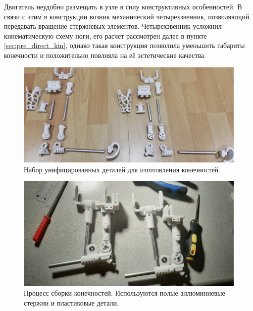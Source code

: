 Двигатель неудобно размещать в узле в силу конструктивных особенностей. В связи с этим в конструкции возник механический четырехзвенник, позволяющий передавать вращение стержневых элементов. Четырехзвенник усложнил кинематическую схему ноги, его расчет рассмотрен далее в пункте \ref{sec:pre_direct_kin}, однако такая конструкция позволила уменьшить габариты конечности и положительно повлияла на её эстетические качества. 

\begin{figure}[h]
    \centering
    \includegraphics[width=\textwidth]{chapter_mechanics_construction/figure14.jpg}
    \caption{Набор унифицированных деталей для изготовления конечностей.}
    \label{fig:the_same_details}
\end{figure}

\begin{figure}[h]
    \centering
    \includegraphics[width=\textwidth]{chapter_mechanics_construction/figure12.png}
    \caption{Процесс сборки конечностей. Используются полые аллюминиевые стержни и пластиковые детали.}
    \label{}
\end{figure}

